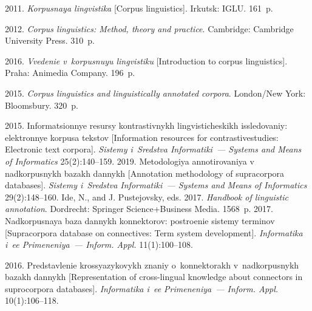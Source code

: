   \begin{multicols}{2}

\renewcommand{\bibname}{\protect\rmfamily References}

{\small\frenchspacing
 {%
 \begin{thebibliography}{99}
 
 2011. \textit{Korpusnaya lingvistika} 
[Corpus linguistics]. 
Irkutsk: IGLU. 161~p.

 2012. \textit{Corpus linguistics: Method, theory and practice}. 
Cambridge: Cambridge University Press. 310~p.


 2016. \textit{Vvedenie v~korpusnuyu lingvistiku} [Introduction to corpus linguistics].
Praha: 
Animedia Company. 196~p.

 2015. \textit{Corpus linguistics and linguistically 
annotated corpora}. London/New York: Bloomsbury. 320~p.

 2015. Informatsionnye resursy kontrastivnykh lingvisticheskikh issledovaniy: 
elektronnye korpusa tekstov [Information resources for contrastive\linebreak studies: Electronic text corpora]. 
\textit{Sistemy i~Sredstva Informatiki~--- Systems and Means of Informatics} 25(2):140--159.
 2019. Metodologiya annotirovaniya v 
nadkorpusnykh bazakh dannykh [Annotation methodology of supracorpora databases]. \textit{Sistemy 
i~Sredstva Informatiki~--- Systems and Means of Informatics} 29(2):148--160.
Ide, N., and J. Pustejovsky, eds. 2017. \textit{Handbook of linguistic annotation}. Dordrecht: Springer 
Science\;+\;Business Media. 1568~p.
 2017. Nadkorpusnaya baza dannykh 
konnektorov: postroenie sistemy terminov [Supracorpora database on connectives: Term system 
development]. \textit{Informatika i~ee  
Primeneniya~--- Inform. Appl.} 11(1):100--108.

 2016. Predstavlenie 
krossyazykovykh znaniy o~konnektorakh v~nadkorpusnykh bazakh dannykh [Representation of cross-lingual 
knowledge about connectors in suprocorpora databases]. \textit{Informatika i~ee Primeneniya~--- Inform. 
Appl.} 10(1):106--118.


\end{thebibliography}}}
\end{multicols}
